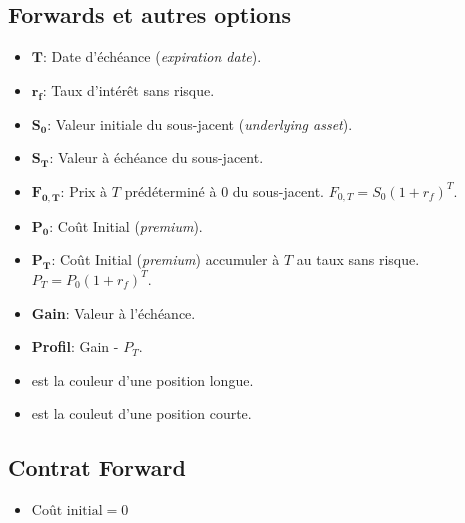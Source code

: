 \documentclass[10pt, french]{article}
\begin{document}
\small
\begin{multicols*}{3} %


\section*{Forwards et autres options}
\begin{itemize}[align=left,leftmargin=*]
    \item $\mathbf{T}$: Date d'échéance (\emph{expiration date}).
    \item $\mathbf{r_f}$: Taux d'intérêt sans risque.
    \item $\mathbf{S_0}$: Valeur initiale du sous-jacent (\emph{underlying asset}).
    \item $\mathbf{S_T}$: Valeur à échéance du sous-jacent.
    \item $\mathbf{F_{0,T}}$: Prix à $T$ prédéterminé à $0$ du sous-jacent. $F_{0,T}=S_0(1+r_f)^T$.
    \item $\mathbf{P_0}$: Coût Initial (\emph{premium}). %
    \item $\mathbf{P_T}$: Coût Initial (\emph{premium}) accumuler à $T$ au taux sans risque. $P_T = P_0(1+r_f)^T$.
    \item \textbf{Gain}: Valeur à l'échéance.
    \item \textbf{Profil}: Gain - $P_T$.
    \item {\color{LongColor} } est la couleur d'une position longue.
    \item {\color{ShortColor} } est la couleut d'une position courte.
\end{itemize}
\subsection*{Contrat Forward}
\begin{itemize}[align=left,leftmargin=*]
    \item $\text{Coût initial} = 0$
\end{itemize}

\end{multicols*}
\end{document}
